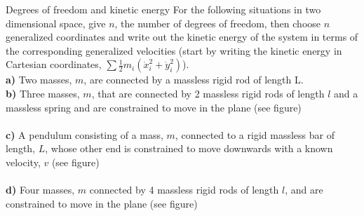 %
\begin{problem}{Degrees of freedom and kinetic energy}
\label{prob_Intro_2}
For the following situations in two dimensional space, give $n$, the number of degrees of freedom, then choose $n$ generalized coordinates and write out the kinetic energy of the system in terms of the corresponding generalized velocities (start by writing the kinetic energy in Cartesian coordinates, $\sum \frac{1}{2}m_i(\dot x_i^2+\dot y_i^2)$).\\
\textbf{a)} Two masses, $m$, are connected by a massless rigid rod of length L.\\
\textbf{b)} Three masses, $m$, that are connected by 2 massless rigid rods of length $l$ and a massless spring and are constrained to move in the plane (see figure)\\
\\
\textbf{c)} A pendulum consisting of a mass, $m$, connected to a rigid massless bar of length, $L$, whose other end is constrained to move downwards with a known velocity, $v$ (see figure)\\
\\
\textbf{d)} Four masses, $m$ connected by 4 massless rigid rods of length $l$, and are constrained to move in the plane (see figure)\\
\end{problem}
%
%
